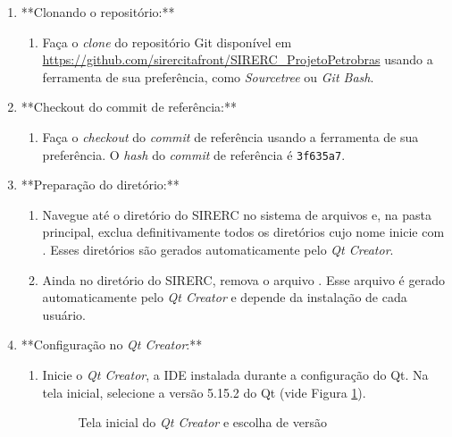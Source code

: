 \documentclass[a4paper,11pt]{article}
\newcommand{\sistema}{\textsf{SIRERC}}
\newcommand{\qtcreator}{\textit{Qt Creator}}
\begin{document}
\begin{enumerate}
	\item **Clonando o repositório:**
	\begin{enumerate}
		\item Faça o \emph{clone} do repositório Git disponível em \url{https://github.com/sirercitafront/SIRERC_ProjetoPetrobras} usando a ferramenta de sua preferência, como \textit{Sourcetree} ou \textit{Git Bash}.
	\end{enumerate}
	
	\item **Checkout do commit de referência:**
	\begin{enumerate}
		\item Faça o \emph{checkout} do \emph{commit} de referência usando a ferramenta de sua preferência. O \emph{hash} do \emph{commit} de referência é \texttt{3f635a7}.
	\end{enumerate}
	
	\item **Preparação do diretório:**
	\begin{enumerate}
		\item Navegue até o diretório do \sistema{} no sistema de arquivos e, na pasta principal, exclua definitivamente todos os diretórios cujo nome inicie com . Esses diretórios são gerados automaticamente pelo \qtcreator{}.
		\item Ainda no diretório do \sistema{}, remova o arquivo . Esse arquivo é gerado automaticamente pelo \qtcreator{} e depende da instalação de cada usuário.
	\end{enumerate}
	
	\item **Configuração no \qtcreator{}:**
	\begin{enumerate}
		\item Inicie o \qtcreator{}, a IDE instalada durante a configuração do Qt. Na tela inicial, selecione a versão 5.15.2 do Qt (vide Figura \ref{fig:qtcreatorver}).
		
		\begin{figure}[H]\centering
			\caption{Tela inicial do \qtcreator{} e escolha de versão}\label{fig:qtcreatorver}
		\end{figure}
		

\end{enumerate}
\end{enumerate}
\end{document}
